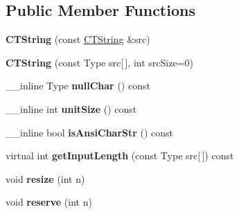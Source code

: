 \subsection*{Public Member Functions}
\begin{DoxyCompactItemize}
\item 
\hypertarget{classps_1_1base_1_1CTString_a75e62967ef42577b9b0c4788c2b3ee9d}{}{\bfseries C\+T\+String} (const \hyperlink{classps_1_1base_1_1CTString}{C\+T\+String} \&src)\label{classps_1_1base_1_1CTString_a75e62967ef42577b9b0c4788c2b3ee9d}

\item 
\hypertarget{classps_1_1base_1_1CTString_a3ae9761c74095944c8d5bb1e881e67e3}{}{\bfseries C\+T\+String} (const Type src\mbox{[}$\,$\mbox{]}, int src\+Size=0)\label{classps_1_1base_1_1CTString_a3ae9761c74095944c8d5bb1e881e67e3}

\item 
\hypertarget{classps_1_1base_1_1CTString_a0de754b048aafdbc33a7a93189c9f10f}{}\+\_\+\+\_\+inline Type {\bfseries null\+Char} () const \label{classps_1_1base_1_1CTString_a0de754b048aafdbc33a7a93189c9f10f}

\item 
\hypertarget{classps_1_1base_1_1CTString_a441c20ed3fc21c2bcbf64d2fe63f0ee3}{}\+\_\+\+\_\+inline int {\bfseries unit\+Size} () const \label{classps_1_1base_1_1CTString_a441c20ed3fc21c2bcbf64d2fe63f0ee3}

\item 
\hypertarget{classps_1_1base_1_1CTString_ae6d0105c7ada1230fbe49541da10d289}{}\+\_\+\+\_\+inline bool {\bfseries is\+Ansi\+Char\+Str} () const \label{classps_1_1base_1_1CTString_ae6d0105c7ada1230fbe49541da10d289}

\item 
\hypertarget{classps_1_1base_1_1CTString_a571191109cbb90af31de864decc8ef4b}{}virtual int {\bfseries get\+Input\+Length} (const Type src\mbox{[}$\,$\mbox{]}) const \label{classps_1_1base_1_1CTString_a571191109cbb90af31de864decc8ef4b}

\item 
\hypertarget{classps_1_1base_1_1CTString_a0b75bb484ea148feec59123fd8004177}{}void {\bfseries resize} (int n)\label{classps_1_1base_1_1CTString_a0b75bb484ea148feec59123fd8004177}

\item 
\hypertarget{classps_1_1base_1_1CTString_a96c45567ca1115d12bf865f772a5f249}{}void {\bfseries reserve} (int n)\label{classps_1_1base_1_1CTString_a96c45567ca1115d12bf865f772a5f249}


\end{DoxyCompactItemize}
